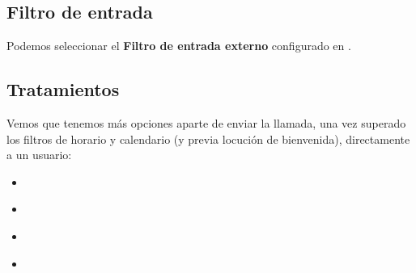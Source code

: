 \documentclass[letterpaper,10pt,spanish]{sphinxmanual}
\begin{document}
\subsection{Filtro de entrada}
\label{pbx_features/external_ddis:ddi-external-filters}
Podemos seleccionar el \textbf{Filtro de entrada externo} configurado en {\hyperref[pbx_features/external_filters:external\string-filters]{}}.

\noindent{}


\subsection{Tratamientos}
\label{pbx_features/external_ddis:routing-logics}\label{pbx_features/external_ddis:ddi-routes}
Vemos que tenemos más opciones aparte de enviar la llamada, una vez superado los filtros de horario y calendario (y previa locución de bienvenida), directamente a un usuario:
\begin{itemize}
\item {} 
{\hyperref[pbx_features/huntgroups:huntgroups]{}}

\end{itemize}

\noindent{}
\begin{itemize}
\item {} 
{\hyperref[pbx_features/ivrs:generic\string-ivrs]{}}

\end{itemize}

\noindent{}
\begin{itemize}
\item {} 
{\hyperref[pbx_features/ivrs:custom\string-ivrs]{}}

\end{itemize}

\noindent{}
\begin{itemize}
\item {} 
{\hyperref[pbx_features/conference_rooms:conference\string-rooms]{}}

\end{itemize}

\noindent{}
\end{document}
